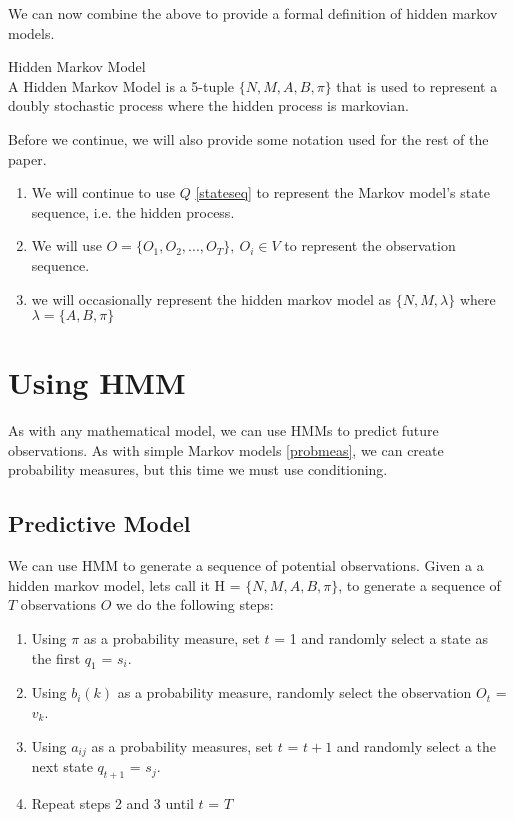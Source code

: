 We can now combine the above to provide a formal definition of hidden markov models.
\begin{definition}
\label{hmm} Hidden Markov Model \\
A Hidden Markov Model is a 5-tuple $\{N,M,A,B,\pi \}$ that is used to represent a doubly stochastic process where the hidden process is markovian. 
\end{definition}

Before we continue, we will also provide some notation used for the rest of the paper.
\begin{enumerate}[i]
    \item We will continue to use $Q$ \ref{stateseq} to represent the Markov model's state sequence, i.e. the hidden process.
    \item We will use $O = \{O_1,O_2,...,O_T\} ,\ O_i \in V$ to represent the observation sequence.
    \item we will occasionally represent the hidden markov model as $\{N,M, \lambda \}$ where $\lambda = \{A, B, \pi\}$ 
\end{enumerate}


\section{Using HMM}
As with any mathematical model, we can use HMMs to predict future observations. As with simple Markov models \ref{probmeas}, we can create probability measures, but this time we must use conditioning. 

\subsection{Predictive Model}
 We can use HMM to generate a sequence of potential observations. Given a a hidden markov model, lets call it H = $\{N,M,A,B,\pi\}$, to generate a sequence of $T$ observations $O$ we do the following steps:
 \begin{enumerate}
    \label{hmmpredict}
     \item Using $\pi$ as a probability measure, set $t$ = 1 and randomly select a state as the first $q_1$ = $s_i$.
     \item Using $b_i(k)$ as a probability measure, randomly select the observation $O_t$ = $v_k$.
     \item Using $a_{ij}$ as a probability measures, set $t$ = $t+1$ and randomly select a the next state $q_{t+1}$ = $s_j$.
     \item Repeat steps 2 and 3 until $t$ = $T$
 \end{enumerate}


